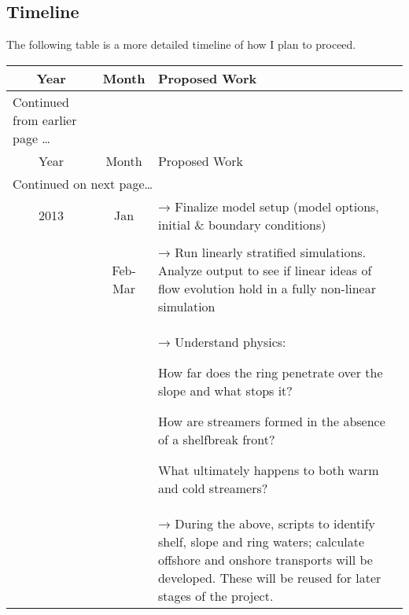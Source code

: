 \subsection{Timeline}
The following table is a more detailed timeline of how I plan to proceed.
\begin{landscape}
\begin{center}
\begin{longtable}{ccp{5.75in}} 
	\toprule 	 Year	& Month	& Proposed Work \\  \midrule\endfirsthead
	\multicolumn{1}{l}{\footnotesize Continued from earlier page \ldots} \\
	\toprule 	 Year	& Month	& Proposed Work \\  \midrule\endhead
  	\multicolumn{3}{l}{{\hfill \footnotesize Continued on next page\ldots}} \\
	\endfoot
	\bottomrule
	\endlastfoot
	
		2013 & Jan	& → Finalize model setup (model options, initial \& boundary conditions) 	\\ 
	
	\\		& Feb-Mar	& → Run linearly stratified simulations. Analyze output to see if linear ideas of flow evolution hold in a fully non-linear simulation \citep{Chapman1987}\\
			& 		& → Understand physics:  \setlength{\plitemsep}{1pt}
					\begin{compactitem}
						\item How far does the ring penetrate over the slope and what stops it?
						\item How are streamers formed in the absence of a shelfbreak front?
						\item What ultimately happens to both warm and cold streamers?
					\end{compactitem} \\ 
			& 		& → During the above, scripts to identify shelf, slope and ring waters; calculate offshore and onshore transports will be developed. These will be reused for later stages of the project.\\
			

\end{longtable}
\end{center}
\end{landscape}
